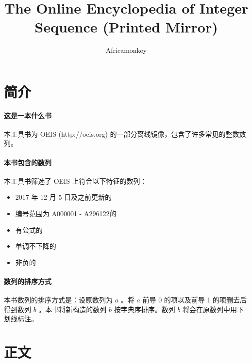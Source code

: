 \documentclass{article}
\begin{document}
\title{The Online Encyclopedia of Integer Sequence (Printed Mirror)}
\author {Africamonkey}

\twocolumn

\section{简介}

\paragraph{这是一本什么书}

本工具书为 OEIS (http://oeis.org) 的一部分离线镜像，包含了许多常见的整数数列。

\paragraph{本书包含的数列}

本工具书筛选了 OEIS 上符合以下特征的数列：

\begin{itemize}
\item 2017 年 12 月 5 日及之前更新的
\item 编号范围为 A000001 - A296122的
\item 有公式的
\item 单调不下降的
\item 非负的
\end{itemize}

\paragraph{数列的排序方式}

本书数列的排序方式是：设原数列为 $a$ 。将 $a$ 前导 0 的项以及前导 1 的项删去后得到数列 $b$ 。本书将新构造的数列 $b$ 按字典序排序。数列 $b$ 将会在原数列中用下划线标注。

\section{正文}

\footnotesize


\end{document}
